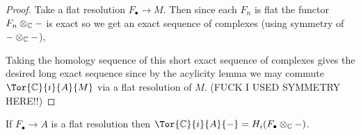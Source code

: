 \documentclass[12pt]{article}
\begin{document}
\begin{proof}
Take a flat resolution $F_\bullet \to M$. Then since each $F_n$ is flat the functor $F_n \otimes_{\mathbb{C}} -$ is exact so we get an exact sequence of complexes (using symmetry of $- \otimes_{\mathbb{C}} -$),
\begin{center}
\end{center}
Taking the homology sequence of this short exact sequence of complexes gives the desired long exact sequence since by the acylicity lemma we may commute $\Tor{\C}{i}{A}{M}$ via a flat resolution of $M$.  (FUCK I USED SYMMETRY HERE!!)
\end{proof}

\begin{lemma}
If $F_\bullet \to A$ is a flat resolution then $\Tor{\C}{i}{A}{-} = H_i(F_\bullet \otimes_\C -)$.
\end{lemma}
\end{document}
